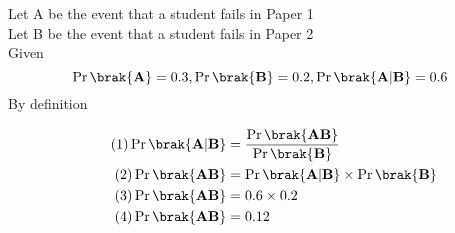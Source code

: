 Let A be the event that a student fails in Paper 1\\
     Let B be the event that a student fails in Paper 2\\
Given $$\Pr\brak{\textbf{A}}=0.3 ,\Pr\brak{\textbf{B}}=0.2 , \Pr\brak{\textbf{A} | \textbf{B}}=0.6$$
 By definition

    
    \begin{align}
    \centering
    \tag{1}
\Pr\brak{\textbf{A} | \textbf{B}}&=\frac{\Pr\brak{\textbf{A}   \textbf{B}}}{\Pr\brak{\textbf{B}}}\label{ec31:eq1}\\
\tag{2}
\Pr\brak{\textbf{A}   \textbf{B}}&=\Pr\brak{\textbf{A} | \textbf{B}}\times\Pr\brak{\textbf{B}}\label{ec31:eq2}\\
\tag{3}
\Pr\brak{\textbf{A}   \textbf{B}}&=0.6\times 0.2\label{ec31:eq3}\\
\tag{4}
\Pr\brak{\textbf{A}   \textbf{B}}&=0.12\label{ec31:eq4}
\end{align}

